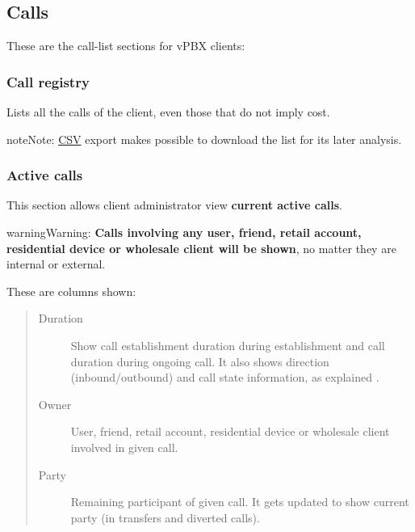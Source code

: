 \documentclass[letterpaper,10pt,english]{sphinxmanual}
\begin{document}
\subsection{Calls}
\label{administration_portal/client/vpbx/calls/index::doc}\label{administration_portal/client/vpbx/calls/index:calls}
These are the call-list sections for vPBX clients:


\subsubsection{Call registry}
\label{administration_portal/client/vpbx/calls/call_registry::doc}\label{administration_portal/client/vpbx/calls/call_registry:call-registry}\label{administration_portal/client/vpbx/calls/call_registry:id1}
Lists all the calls of the client, even those that do not imply cost.

\begin{notice}{note}{Note:}
\href{https://es.wikipedia.org/wiki/CSV}{CSV} export makes possible to
download the list for its later analysis.
\end{notice}


\subsubsection{Active calls}
\label{administration_portal/client/vpbx/calls/active_calls::doc}\label{administration_portal/client/vpbx/calls/active_calls:active-calls}
This section allows client administrator view \textbf{current active calls}.

\begin{notice}{warning}{Warning:}
\textbf{Calls involving any user, friend, retail account, residential device or wholesale client will be shown},
no matter they are internal or external.
\end{notice}

These are columns shown:
\begin{quote}
\begin{description}
\item[{Duration}] \leavevmode
Show call establishment duration during establishment and call duration during ongoing call. It also shows
direction (inbound/outbound) and call state information, as explained {\hyperref[administration_portal/platform/active_calls:call\string-state]{}}.

\item[{Owner}] \leavevmode
User, friend, retail account, residential device or wholesale client involved in given call.

\item[{Party}] \leavevmode
Remaining participant of given call. It gets updated to show current party (in transfers and diverted calls).

\end{description}
\end{quote}
\end{document}
